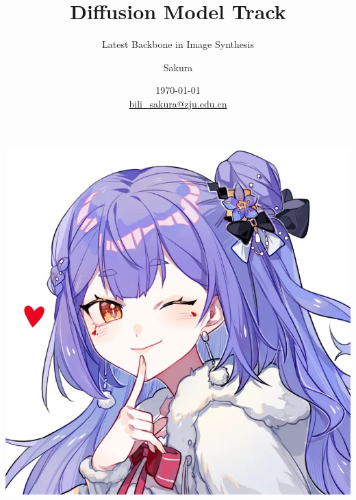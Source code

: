\documentclass[aspectratio=169]{beamer}
\title[]{Diffusion Model Track}
\subtitle{Latest Backbone in Image Synthesis}
\author[author]{Sakura}
\date{\today\\{\small\href{mailto:bili_sakura@zju.edu.cn}{bili\_sakura@zju.edu.cn}}}
\begin{document}
\begin{frame}
  \begin{minipage}{0.68\linewidth}
    \titlepage
  \end{minipage}%
  \hfill
  \begin{minipage}{0.30\linewidth}
    \centering
    \includegraphics[width=0.9\linewidth]{profile_new.jpeg}
  \end{minipage}
\end{frame}


\end{document}
